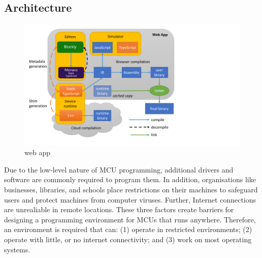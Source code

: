 

    


\subsection{Architecture}

\begin{figure}[t]
    \includegraphics[width=4.8in]{makecodeFig.pdf}
\caption{\label{fig:makecode}\MC web app}
\end{figure}

Due to the low-level nature of MCU programming, additional drivers and software are commonly required to program them. In addition, organisations like businesses, libraries, and schools place restrictions on their machines to safeguard users and protect machines from computer viruses. Further, Internet connections are unrealiable in remote locations. These three factors create barriers for designing a programming environment for MCUs that runs anywhere. Therefore, an environment is required that can: (1) operate in restricted environments; (2) operate with little, or no internet connectivity; and (3) work on most operating systems.

